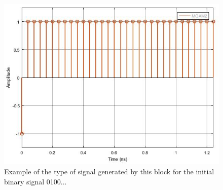 \begin{figure}
	\centering
	\includegraphics[width=\textwidth]{./lib/m_qam_mapper/figures/IQmodulator_output}
	
	\caption{Example of the type of signal generated by this block for the initial binary signal 0100... }\label{DeterministicAppendZeros}

\end{figure}

